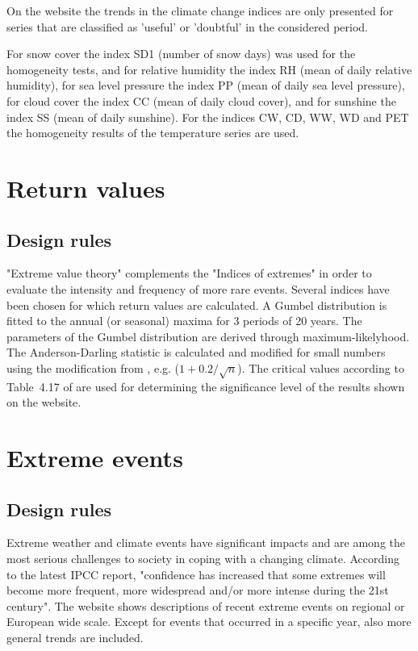 \documentclass[a4paper,11pt]{article}
\begin{document}
On the website the trends in the climate change indices are only
presented for series that are classified as 'useful' or 'doubtful' in
the considered period.

For snow cover the index SD1 (number of snow days) was used for the
homogeneity tests, and for relative humidity the index RH (mean of daily
relative humidity), for sea level pressure the index PP (mean of daily
sea level pressure), for cloud cover the index CC (mean of daily cloud
cover), and for sunshine the index SS (mean of daily sunshine). For
the indices CW, CD, WW, WD and PET the homogeneity results of the
temperature series are used.



\section{Return values}
\label{sec:returnvalues}
\subsection{Design rules}
\label{sec:returnvaluesrules}

"Extreme value theory" complements the "Indices of extremes" in order
to evaluate the intensity and frequency of more rare events. Several
indices have been chosen for which return values are calculated. A
Gumbel distribution is fitted to the annual (or seasonal) maxima for 3
periods of 20 years. The parameters of the Gumbel distribution are
derived through maximum-likelyhood. The Anderson-Darling statistic is
calculated and modified for small numbers using the modification from
\citet{stephens:86}, e.g. ($1 + 0.2/\sqrt{n}$). The critical values
according to Table~4.17 of \citet{stephens:86} are used for determining
the significance level of the results shown on the website.




\section{Extreme events}
\label{sec:events}
\subsection{Design rules}
\label{sec:eventsrules}

Extreme weather and climate events have significant impacts and are
among the most serious challenges to society in coping with a changing
climate. According to the latest IPCC report, "confidence has
increased that some extremes will become more frequent, more
widespread and/or more intense during the 21st century". The website
shows descriptions of recent extreme events on regional or European
wide scale. Except for events that occurred in a specific year, also more
general trends are included. 
\end{document}
